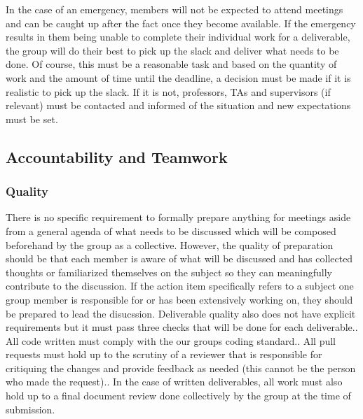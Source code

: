 \documentclass{article}
\begin{document}
\par{ In the case of an emergency, members will not be expected to attend meetings and can be caught up after the fact once they become available. 
If the emergency results in them being unable to complete their individual work for a deliverable, the group will do their best to pick up the slack
and deliver what needs to be done. Of course, this must be a reasonable task and based on the quantity of work and the amount of time until the deadline,
a decision must be made if it is realistic to pick up the slack. If it is not, professors, TAs and supervisors (if relevant) must be contacted and informed
of the situation and new expectations must be set.}


\subsection*{Accountability and Teamwork}

\subsubsection*{Quality} 


\par{ There is no specific requirement to formally prepare anything for meetings aside from a general agenda of what needs to be discussed which will be
composed beforehand by the group as a collective. However, the quality of preparation should be that each member is aware of what will be discussed and 
has collected thoughts or familiarized themselves on the subject so they can meaningfully contribute to the discussion. If the action item specifically 
refers to a subject one group member is responsible for or has been extensively working on, they should be prepared to lead the disucssion. \newline\newline\indent
Deliverable quality also does not have explicit requirements but it must pass three checks that will be done for each deliverable.\newline{}. All code written must comply with the our groups coding standard.. All pull requests must hold up to the scrutiny of a reviewer that is responsible for critiquing the changes and provide feedback as needed (this cannot be the person who made the request).. In the case of written deliverables, all work must also hold up to a final document review done collectively by the group at the time of submission.}  
\end{document}
